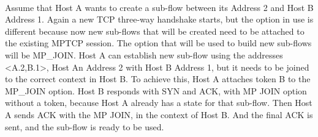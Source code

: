 \paragraph{} Assume that Host A wants to create a sub-flow between its Address 2 and Host B Address 1. Again a
new TCP three-way handshake starts, but the option in use is different because now new sub-flows that will be created need to be attached to the existing MPTCP session. The option that will be used to build new sub-flows will be MP\_JOIN. Host A can establish new sub-flow using the addresses <A.2,B.1>, Host
An Address 2 with Host B Address 1, but it needs to be joined to the correct context in Host B. To achieve this, Host A attaches token B to the MP\_JOIN option. Host B responds with SYN and ACK, with MP JOIN option without a token, because Host A already has a state for that sub-flow. Then Host A sends ACK with the MP JOIN, in the context of Host B. And the final ACK is sent, and the sub-flow is ready to be used.

